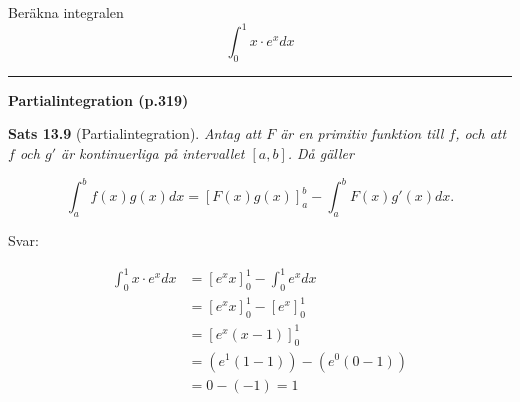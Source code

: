 \documentclass[11pt]{article}
\begin{document}
Beräkna integralen
\[
    \int_0^1 x \cdot e^x dx
\]

\noindent\rule{\textwidth}{0.5pt}

\textbf{Partialintegration (p.319)}

\textbf{Sats 13.9} (Partialintegration). \textit{Antag att $F$ är en primitiv funktion till $f$, och att $f$ och $g'$ är kontinuerliga på intervallet $[a, b]$. Då gäller}

\begin{equation*}
    \int_a^b{f(x)g(x)}dx = \left [F(x)g(x)\right ]_a^b - \int_a^b{F(x)g'(x)}dx.
\end{equation*}

Svar:

\begin{align*}
    \int_{0}^{1} x \cdot e^{x} dx &= \left[e^{x} x\right]_0^1 - \int_0^1 e^{x} dx \\
    &= \left[e^{x} x\right]_0^1 - \left[ e^x \right]_0^1 \\
    &= \left[e^x(x - 1)\right]_0^1 \\
    &= (e^1(1 - 1)) - (e^0(0 - 1)) \\
    &= 0 - (-1) = 1
\end{align*}
\end{document}
